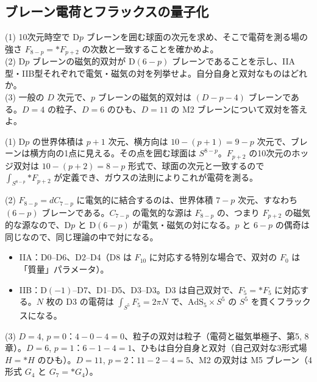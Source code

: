 \subsection{ブレーン電荷とフラックスの量子化}

\begin{problem}[難易度 A]\label{ch10-prob-dbrane}
(1) 10次元時空で D$p$ ブレーンを囲む球面の次元を求め、そこで電荷を測る場の強さ $F_{8-p}={*F_{p+2}}$ の次数と一致することを確かめよ。\\
(2) D$p$ ブレーンの磁気的双対が D$(6-p)$ ブレーンであることを示し、IIA型・IIB型それぞれで電気・磁気の対を列挙せよ。自分自身と双対なものはどれか。\\
(3) 一般の $D$ 次元で、$p$ ブレーンの磁気的双対は $(D-p-4)$ ブレーンである。$D=4$ の粒子、$D=6$ のひも、$D=11$ の M2 ブレーンについて双対を答えよ。
\end{problem}

\begin{solution}
(1) D$p$ の世界体積は $p+1$ 次元、横方向は $10-(p+1)=9-p$ 次元で、ブレーンは横方向の1点に見える。その点を囲む球面は $S^{8-p}$。$F_{p+2}$ の10次元のホッジ双対は $10-(p+2)=8-p$ 形式で、球面の次元と一致するので $\int_{S^{8-p}}{*F_{p+2}}$ が定義でき、ガウスの法則によりこれが電荷を測る。

(2) $F_{8-p}=dC_{7-p}$ に電気的に結合するのは、世界体積 $7-p$ 次元、すなわち $(6-p)$ ブレーンである。$C_{7-p}$ の電気的な源は $F_{8-p}$ の、つまり $F_{p+2}$ の磁気的な源なので、D$p$ と D$(6-p)$ が電気・磁気の対になる。$p$ と $6-p$ の偶奇は同じなので、同じ理論の中で対になる。
\begin{itemize}
\item IIA：D0–D6、D2–D4（D8 は $F_{10}$ に対応する特別な場合で、双対の $F_0$ は「質量」パラメータ）。
\item IIB：D$(-1)$–D7、D1–D5、D3–D3。D3 は自己双対で、$F_5={*F_5}$ に対応する。$N$ 枚の D3 の電荷は $\int_{S^5}F_5=2\pi N$ で、$\mathrm{AdS}_5\times S^5$ の $S^5$ を貫くフラックスになる。
\end{itemize}

(3) $D=4$, $p=0$：$4-0-4=0$、粒子の双対は粒子（電荷と磁気単極子、第5, 8章）。$D=6$, $p=1$：$6-1-4=1$、ひもは自分自身と双対（自己双対な3形式場 $H={*H}$ のひも）。$D=11$, $p=2$：$11-2-4=5$、M2 の双対は M5 ブレーン（4形式 $G_4$ と $G_7={*G_4}$）。
\end{solution}

